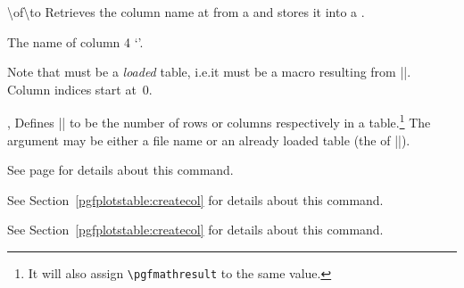 \begin{command}{\pgfplotstablegetcolumnnamebyindex{}\textbackslash of\textbackslash to}
    Retrieves the column name at  from a  and
    stores it into a .
\begin{codeexample}[pre={\begin{lateximage}},post={\end{lateximage}}]
\of{\loadedtable}\to\pgfplotsretval
The name of column 4 `\pgfplotsretval'.
\end{codeexample}
    \noindent Note that  must be a \emph{loaded} table, i.e.\@ it
    must be a macro resulting from |\pgfplotstableread|. Column indices start
    at~$0$.
\end{command}

\begin{commandlist}{%
    \pgfplotstablegetrowsof{},
    \pgfplotstablegetcolsof{}%
}
    Defines |\pgfplotsretval| to be the number of rows or columns respectively
    in a table.\footnote{It will also assign \texttt{\textbackslash pgfmathresult}
    to the same value.} The argument may be either a file name or an already
    loaded table (the  of |\pgfplotstableread|).
\end{commandlist}

\begin{command}{\pgfplotstablevertcat{}}
    See page \pageref{table:vertcat} for details about this command.
\end{command}

\begin{command}{\pgfplotstablenew{}}
    See Section~\ref{pgfplotstable:createcol} for details about this command.
\end{command}
\begin{command}{\pgfplotstablecreatecol{}}
    See Section~\ref{pgfplotstable:createcol} for details about this command.
\end{command}

